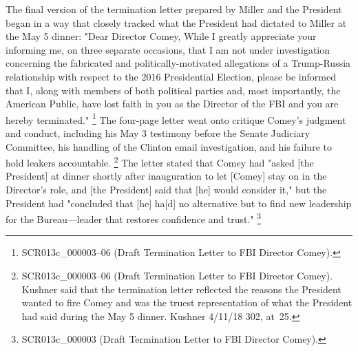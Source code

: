 {The final version of the termination letter prepared by Miller and the President began in a way that closely tracked what the President had dictated to Miller at the May 5 dinner:
"Dear Director Comey, While I greatly appreciate your informing me, on three separate occasions, that I am not under investigation concerning the fabricated and politically-motivated allegations of a Trump-Russia relationship with respect to the 2016 Presidential Election, please be informed that I, along with members of both political parties and, most importantly, the American Public, have lost faith in you as the Director of the FBI and you are hereby terminated."%
\footnote{SCR013c\_000003--06 (Draft Termination Letter to FBI Director Comey).}
The four-page letter went onto critique Comey's judgment and conduct, including his May 3 testimony before the
Senate Judiciary Committee, his handling of the Clinton email investigation, and his failure to hold leakers accountable.%
\footnote{SCR013c\_000003--06 (Draft Termination Letter to FBI Director Comey).
Kushner said that the termination letter reflected the reasons the President wanted to fire Comey and was the truest representation of what the President had said during the May 5 dinner.
Kushner 4/11/18 302, at~25.}
The letter stated that Comey had "asked [the President] at dinner shortly after inauguration to let [Comey] stay on in the Director's role, and [the President] said that [he] would consider it," but the President had "concluded that [he] ha[d] no alternative but to find new leadership for the Bureau---leader that restores confidence and trust."%
\footnote{SCR013c\_000003 (Draft Termination Letter to FBI Director Comey).}

}
